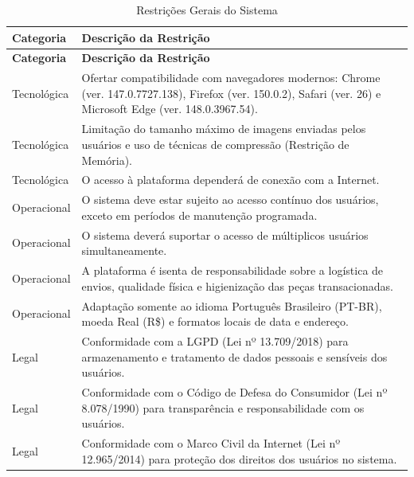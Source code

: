 \documentclass[
	article,			%
	11pt,				%
	oneside,			%
	a4paper,			%
	english,			%
	brazil,				%
	sumario=tradicional
	]{abntex2}
\begin{document}
\begin{longtable}{|l|p{10cm}|}

\caption{Restrições Gerais do Sistema} \\

\hline
\cellcolor{gray!30} \textbf{Categoria} &
\cellcolor{gray!30} \textbf{Descrição da Restrição} \\
\hline
\endfirsthead

\hline
\cellcolor{gray!30} \textbf{Categoria} &
\cellcolor{gray!30} \textbf{Descrição da Restrição} \\
\hline
\endhead

Tecnológica & Ofertar compatibilidade com navegadores modernos: Chrome (ver. 147.0.7727.138), Firefox (ver. 150.0.2), Safari (ver. 26) e Microsoft Edge (ver. 148.0.3967.54). \\
\hline

Tecnológica & Limitação do tamanho máximo de imagens enviadas pelos usuários e uso de técnicas de compressão (Restrição de Memória). \\
\hline

Tecnológica & O acesso à plataforma dependerá de conexão com a Internet. \\
\hline

Operacional & O sistema deve estar sujeito ao acesso contínuo dos usuários, exceto em períodos de manutenção programada. \\
\hline

Operacional & O sistema deverá suportar o acesso de múltiplicos usuários simultaneamente. \\
\hline

Operacional & A plataforma é isenta de responsabilidade sobre a logística de envios, qualidade física e higienização das peças transacionadas. \\
\hline

Operacional & Adaptação somente ao idioma Português Brasileiro (PT-BR), moeda Real (R\$) e formatos locais de data e endereço. \\
\hline

Legal & Conformidade com a LGPD (Lei nº 13.709/2018) para armazenamento e tratamento de dados pessoais e sensíveis dos usuários. \\
\hline

Legal & Conformidade com o Código de Defesa do Consumidor (Lei nº 8.078/1990) para transparência e responsabilidade com os usuários. \\
\hline

Legal & Conformidade com o Marco Civil da Internet (Lei nº 12.965/2014) para proteção dos direitos dos usuários no sistema. \\
\hline


\end{longtable}
\end{document}
